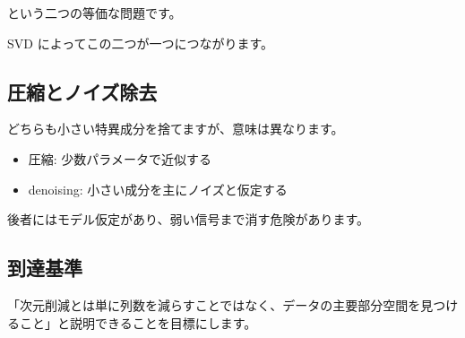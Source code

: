 \documentclass[
  11pt,
  a4paper,
]{ltjsarticle}
\providecommand{\tightlist}{%
  \setlength{\itemsep}{0pt}\setlength{\parskip}{0pt}}
\begin{document}
という二つの等価な問題です。

SVD によってこの二つが一つにつながります。

\hypertarget{ux5727ux7e2eux3068ux30ceux30a4ux30baux9664ux53bb}{%
\subsection{圧縮とノイズ除去}\label{ux5727ux7e2eux3068ux30ceux30a4ux30baux9664ux53bb}}

どちらも小さい特異成分を捨てますが、意味は異なります。

\begin{itemize}
\tightlist
\item
  圧縮: 少数パラメータで近似する
\item
  denoising: 小さい成分を主にノイズと仮定する
\end{itemize}

後者にはモデル仮定があり、弱い信号まで消す危険があります。

\hypertarget{ux5230ux9054ux57faux6e96}{%
\subsection{到達基準}\label{ux5230ux9054ux57faux6e96}}

「次元削減とは単に列数を減らすことではなく、データの主要部分空間を見つけること」と説明できることを目標にします。
\end{document}
